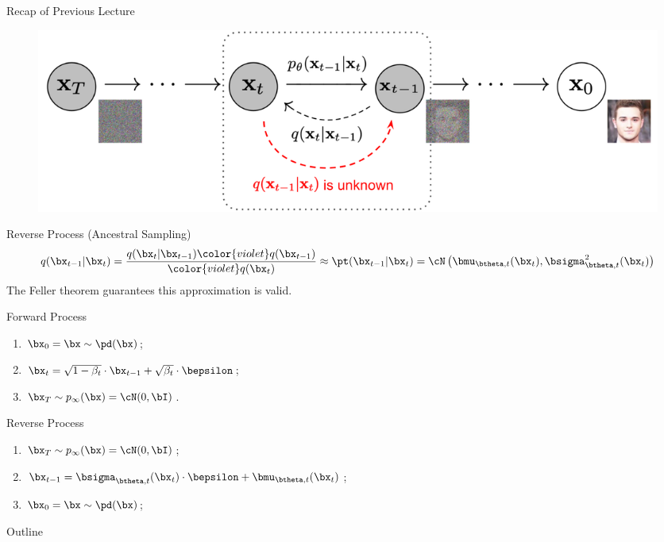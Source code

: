 \documentclass{beamer}
\begin{document}
\begin{frame}{Recap of Previous Lecture}
    \vspace{-0.3cm}
    \begin{figure}
        \includegraphics[width=0.8\linewidth]{figs/DDPM}
    \end{figure}
    \vspace{-0.5cm}
    \begin{block}{Reverse Process (Ancestral Sampling)}
        \vspace{-0.5cm}
        {\small
        \[
            q(\bx_{t-1}|\bx_{t}) = \frac{q(\bx_{t}|\bx_{t-1}) {\color{violet}q(\bx_{t-1})}}{{\color{violet}q(\bx_{t})}} \approx \pt(\bx_{t - 1} | \bx_t) = \cN \left(\bmu_{\btheta, t}(\bx_t), \bsigma_{\btheta, t}^2(\bx_t)\right)
        \]}
        {\color{gray}The Feller theorem guarantees this approximation is valid.}
    \end{block}
    \begin{minipage}{0.5\linewidth}
        \begin{block}{Forward Process}
            \begin{enumerate}
                \item $\bx_0 = \bx \sim \pd(\bx)$;
                \item $\bx_t = \sqrt{1 - \beta_t} \cdot \bx_{t - 1} + \sqrt{\beta_t} \cdot \bepsilon$;
                \item $\bx_T \sim p_{\infty}(\bx) = \cN(0, \bI)$.
            \end{enumerate}
        \end{block}
    \end{minipage}%
    \begin{minipage}{0.55\linewidth}
        \begin{block}{Reverse Process}
            \begin{enumerate}
                \item $\bx_T \sim p_{\infty}(\bx) = \cN(0, \bI)$;
                \item $\bx_{t - 1} = \bsigma_{\btheta, t}(\bx_t) \cdot \bepsilon + \bmu_{\btheta, t}(\bx_t)$;
                \item $\bx_0 = \bx \sim \pd(\bx)$;
            \end{enumerate}
        \end{block}
    \end{minipage}
\end{frame}
\begin{frame}{Outline}
    \tableofcontents
\end{frame}
\end{document}

